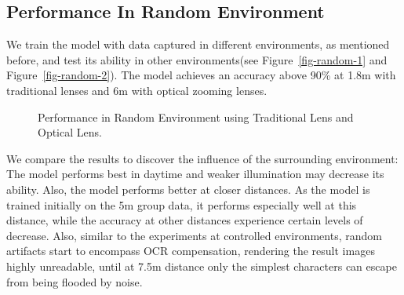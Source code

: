 \subsection{Performance In Random Environment}
We train the model with data captured in different environments, as mentioned before, and test its ability in other environments(see Figure~\ref{fig-random-1} and Figure~\ref{fig-random-2}). The model achieves an accuracy above 90\% at 1.8m with traditional lenses and 6m with optical zooming lenses. 
\begin{figure}[!t]
    \centering
    \hfill
    \caption{Performance in Random Environment using Traditional Lens and Optical Lens.}
    \label{fig:control}
\end{figure}

We compare the results to discover the influence of the surrounding environment: The model performs best in daytime and weaker illumination may decrease its ability. Also, the model performs better at closer distances. As the model is trained initially on the 5m group data, it performs especially well at this distance, while the accuracy at other distances experience certain levels of decrease. Also, similar to the experiments at controlled environments, random artifacts start to encompass OCR compensation, rendering the result images highly unreadable, until at 7.5m distance only the simplest characters can escape from being flooded by noise.


